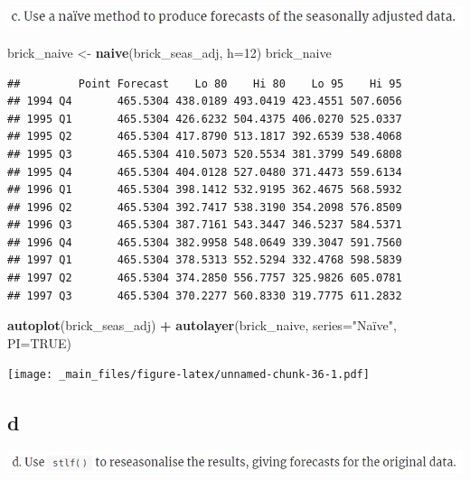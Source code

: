 \documentclass[]{book}
\newenvironment{Shaded}{\begin{snugshade}}{\end{snugshade}}
\newcommand{\DataTypeTok}[1]{\textcolor[rgb]{0.13,0.29,0.53}{#1}}
\newcommand{\DecValTok}[1]{\textcolor[rgb]{0.00,0.00,0.81}{#1}}
\newcommand{\KeywordTok}[1]{\textcolor[rgb]{0.13,0.29,0.53}{\textbf{#1}}}
\newcommand{\NormalTok}[1]{#1}
\newcommand{\OperatorTok}[1]{\textcolor[rgb]{0.81,0.36,0.00}{\textbf{#1}}}
\newcommand{\OtherTok}[1]{\textcolor[rgb]{0.56,0.35,0.01}{#1}}
\newcommand{\StringTok}[1]{\textcolor[rgb]{0.31,0.60,0.02}{#1}}
\begin{document}
\includegraphics{./week2/6.6c.png}

\begin{Shaded}
\begin{Highlighting}[]
\NormalTok{brick_naive <-}\StringTok{ }\KeywordTok{naive}\NormalTok{(brick_seas_adj, }\DataTypeTok{h=}\DecValTok{12}\NormalTok{)}
\NormalTok{brick_naive}
\end{Highlighting}
\end{Shaded}

\begin{verbatim}
##         Point Forecast    Lo 80    Hi 80    Lo 95    Hi 95
## 1994 Q4       465.5304 438.0189 493.0419 423.4551 507.6056
## 1995 Q1       465.5304 426.6232 504.4375 406.0270 525.0337
## 1995 Q2       465.5304 417.8790 513.1817 392.6539 538.4068
## 1995 Q3       465.5304 410.5073 520.5534 381.3799 549.6808
## 1995 Q4       465.5304 404.0128 527.0480 371.4473 559.6134
## 1996 Q1       465.5304 398.1412 532.9195 362.4675 568.5932
## 1996 Q2       465.5304 392.7417 538.3190 354.2098 576.8509
## 1996 Q3       465.5304 387.7161 543.3447 346.5237 584.5371
## 1996 Q4       465.5304 382.9958 548.0649 339.3047 591.7560
## 1997 Q1       465.5304 378.5313 552.5294 332.4768 598.5839
## 1997 Q2       465.5304 374.2850 556.7757 325.9826 605.0781
## 1997 Q3       465.5304 370.2277 560.8330 319.7775 611.2832
\end{verbatim}

\begin{Shaded}
\begin{Highlighting}[]
\KeywordTok{autoplot}\NormalTok{(brick_seas_adj) }\OperatorTok{+}
\StringTok{  }\KeywordTok{autolayer}\NormalTok{(brick_naive,}
    \DataTypeTok{series=}\StringTok{"Naïve"}\NormalTok{, }\DataTypeTok{PI=}\OtherTok{TRUE}\NormalTok{)}
\end{Highlighting}
\end{Shaded}

\texttt{[image: \_main\_files/figure-latex/unnamed-chunk-36-1.pdf]}

\hypertarget{d-2}{%
\subsection{d}\label{d-2}}

\includegraphics{./week2/6.6d.png}
\end{document}
